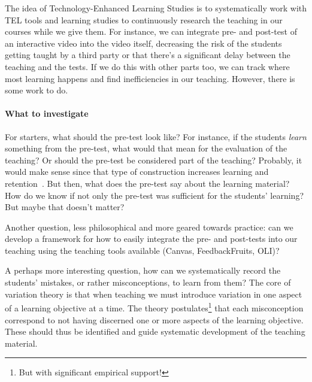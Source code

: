 The idea of Technology-Enhanced Learning Studies is to systematically work with 
\ac{TEL} tools and learning studies to continuously research the teaching in 
our courses while we give them.
For instance, we can integrate pre- and post-test of an interactive video into 
the video itself, decreasing the risk of the students getting taught by a third 
party or that there's a significant delay between the teaching and the tests.
If we do this with other parts too, we can track where most learning happens 
and find inefficiencies in our teaching.
However, there is some work to do.


\paragraph{What to investigate}

For starters, what should the pre-test look like?
For instance, if the students \emph{learn} something from the pre-test, what 
would that mean for the evaluation of the teaching?
Or should the pre-test be considered part of the teaching?
Probably, it would make sense since that type of construction increases 
learning and retention~\autocite{Szekely1950,BransfordSchwartz1999}.
But then, what does the pre-test say about the learning material?
How do we know if not only the pre-test was sufficient for the students' 
learning?
But maybe that doesn't matter?

Another question, less philosophical and more geared towards practice: can we 
develop a framework for how to easily integrate the pre- and post-tests into 
our teaching using the teaching tools available (Canvas, FeedbackFruits, OLI)?

A perhaps more interesting question, how can we systematically record the 
students' mistakes, or rather misconceptions, to learn from them?
The core of variation theory is that when teaching we must introduce variation 
in one aspect of a learning objective at a time.
The theory postulates\footnote{%
  But with significant empirical support!
} that each misconception correspond to not having discerned one or more 
aspects of the learning objective.
These should thus be identified and guide systematic development of the 
teaching material.


